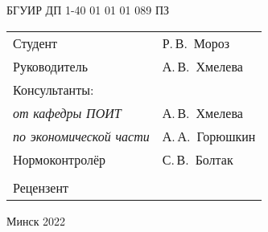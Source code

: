 \begin{titlepage}
\begin{center}
    {БГУИР ДП 1-40 01 01 01 089 ПЗ}\\[2em]
    
    \begin{tabular}{ p{}p{} }
      Студент & Р.\,В.~Мороз \\
      Руководитель & А.\,В.~Хмелева \\
      Консультанты: &\\[0.8em]
      \hspace*{3ex}\emph{от кафедры ПОИТ} & А.\,В.~Хмелева \\
      \hspace*{3ex}\emph{по экономической части} & А.\,А.~Горюшкин \\[2em]
      Нормоконтролёр & С.\,В.~Болтак\\
      & \\
      Рецензент &
    \end{tabular}
    
    \vfill
    {\normalsize Минск 2022}
  \end{center}
\end{titlepage}